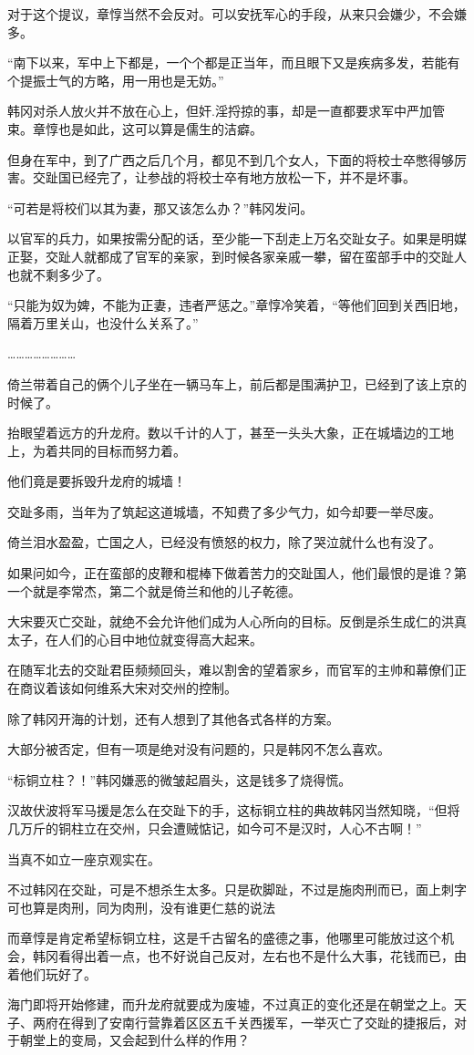 对于这个提议，章惇当然不会反对。可以安抚军心的手段，从来只会嫌少，不会嫌多。

“南下以来，军中上下都是，一个个都是正当年，而且眼下又是疾病多发，若能有个提振士气的方略，用一用也是无妨。”

韩冈对杀人放火并不放在心上，但奸.淫捋掠的事，却是一直都要求军中严加管束。章惇也是如此，这可以算是儒生的洁癖。

但身在军中，到了广西之后几个月，都见不到几个女人，下面的将校士卒憋得够厉害。交趾国已经完了，让参战的将校士卒有地方放松一下，并不是坏事。

“可若是将校们以其为妻，那又该怎么办？”韩冈发问。

以官军的兵力，如果按需分配的话，至少能一下刮走上万名交趾女子。如果是明媒正娶，交趾人就都成了官军的亲家，到时候各家亲戚一攀，留在蛮部手中的交趾人也就不剩多少了。

“只能为奴为婢，不能为正妻，违者严惩之。”章惇冷笑着，“等他们回到关西旧地，隔着万里关山，也没什么关系了。”

……………………

倚兰带着自己的俩个儿子坐在一辆马车上，前后都是围满护卫，已经到了该上京的时候了。

抬眼望着远方的升龙府。数以千计的人丁，甚至一头头大象，正在城墙边的工地上，为着共同的目标而努力着。

他们竟是要拆毁升龙府的城墙！

交趾多雨，当年为了筑起这道城墙，不知费了多少气力，如今却要一举尽废。

倚兰泪水盈盈，亡国之人，已经没有愤怒的权力，除了哭泣就什么也有没了。

如果问如今，正在蛮部的皮鞭和棍棒下做着苦力的交趾国人，他们最恨的是谁？第一个就是李常杰，第二个就是倚兰和他的儿子乾德。

大宋要灭亡交趾，就绝不会允许他们成为人心所向的目标。反倒是杀生成仁的洪真太子，在人们的心目中地位就变得高大起来。

在随军北去的交趾君臣频频回头，难以割舍的望着家乡，而官军的主帅和幕僚们正在商议着该如何维系大宋对交州的控制。

除了韩冈开海的计划，还有人想到了其他各式各样的方案。

大部分被否定，但有一项是绝对没有问题的，只是韩冈不怎么喜欢。

“标铜立柱？！”韩冈嫌恶的微皱起眉头，这是钱多了烧得慌。

汉故伏波将军马援是怎么在交趾下的手，这标铜立柱的典故韩冈当然知晓，“但将几万斤的铜柱立在交州，只会遭贼惦记，如今可不是汉时，人心不古啊！”

当真不如立一座京观实在。

不过韩冈在交趾，可是不想杀生太多。只是砍脚趾，不过是施肉刑而已，面上刺字可也算是肉刑，同为肉刑，没有谁更仁慈的说法

而章惇是肯定希望标铜立柱，这是千古留名的盛德之事，他哪里可能放过这个机会，韩冈看得出着一点，也不好说自己反对，左右也不是什么大事，花钱而已，由着他们玩好了。

海门即将开始修建，而升龙府就要成为废墟，不过真正的变化还是在朝堂之上。天子、两府在得到了安南行营靠着区区五千关西援军，一举灭亡了交趾的捷报后，对于朝堂上的变局，又会起到什么样的作用？

